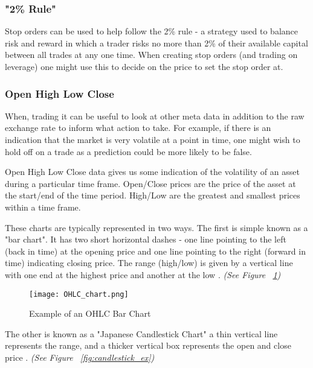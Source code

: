             \subsubsection{"2\% Rule"}
            Stop orders can be used to help follow the 2\% rule - a strategy used to balance risk and reward in which a trader risks no more than 2\% of their available capital between all trades at any one time. When creating stop orders (and trading on leverage) one might use this to decide on the price to set the stop order at. \cite{staff_2017}



            
            \subsubsection{Open High Low Close}

            When, trading it can be useful to look at other meta data in addition to the raw exchange rate to inform what action to take. For example, if there is an indication that the market is very volatile at a point in time, one might wish to hold off on a trade as a prediction could be more likely to be false. 
            
            Open High Low Close data gives us some indication of the volatility of an asset during a particular time frame. Open/Close prices are the price of the asset at the start/end of the time period. High/Low are the greatest and smallest prices within a time frame. \cite{investopedia_OHLC}

            These charts are typically represented in two ways. The first is simple known as a "bar chart". It has two short horizontal dashes - one line pointing to the left (back in time) at the opening price and one line pointing to the right (forward in time) indicating closing price. The range (high/low) is given by a vertical line with one end at the highest price and another at the low \cite{barchart_OHLC}. \textit{(See Figure ~\ref{fig:barchart_ex})}

            \begin{figure}[h]
                \centering
                \texttt{[image: OHLC\_chart.png]}
                \caption{Example of an OHLC Bar Chart \cite{barchart_OHLC}}
                \label{fig:barchart_ex}
            \end{figure}

            The other is known as a "Japanese Candlestick Chart" a thin vertical line represents the range, and a thicker vertical box represents the open and close price \cite{candlestick_OHLC}. \textit{(See Figure ~\ref{fig:candlestick_ex})} 

